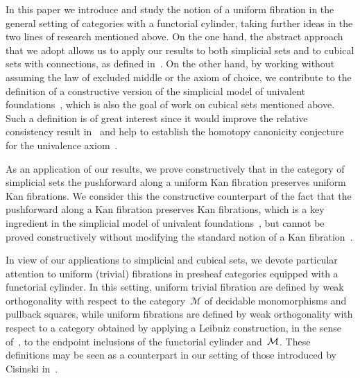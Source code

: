 \documentclass[reqno,10pt,a4paper,oneside,draft]{amsart}
\begin{document}
In this paper we introduce and study the notion of a uniform fibration in the general setting of categories with a functorial cylinder, taking further ideas in the two lines of research mentioned above.  On the one hand, the abstract approach that we adopt allows us to apply our results to both simplicial sets and to cubical sets with connections, as defined in~\cite{coquand-variation}. On the other hand, 
by working without assuming the law of excluded middle or the axiom of choice, we contribute to the definition of a constructive version of the simplicial model of univalent foundations~\cite{voevodsky-simplicial-model}, which is also the goal of work on cubical sets mentioned above. Such a definition is of great interest since it would improve the relative consistency result in~\cite[Theorem~3.4.3]{voevodsky-simplicial-model} and help to establish the homotopy canonicity conjecture for the univalence axiom~\cite[Conjecture 1]{voevodsky:uf}.

As an application of our results, we prove constructively that in the category of simplicial sets the pushforward along a uniform Kan fibration preserves uniform Kan fibrations. We consider this the constructive counterpart of the fact that the pushforward along a Kan fibration preserves Kan fibrations, which is a key ingredient in the simplicial model of univalent foundations~\cite[Lemma~2.3.1]{voevodsky-simplicial-model}, but cannot be proved constructively without modifying the standard notion of a Kan fibration~\cite{coquand-non-constructivity-kan}.

In view of our applications to simplicial and cubical sets, we devote particular attention to uniform (trivial) fibrations in presheaf categories equipped with a functorial cylinder.
In this setting,  uniform trivial fibration are defined by weak orthogonality with respect to the category~$\mathcal{M}$ of decidable monomorphisms and pullback squares, while uniform fibrations are defined by weak orthogonality with respect to a category
obtained by applying a Leibniz construction, in the sense of~\cite{riehl-verity:reedy}, to the endpoint inclusions of
the functorial cylinder and~$\cal{M}$.  These definitions may
be seen as a counterpart in our setting of those introduced by Cisinski in~\cite{cisinski-asterisque}. 
\end{document}
